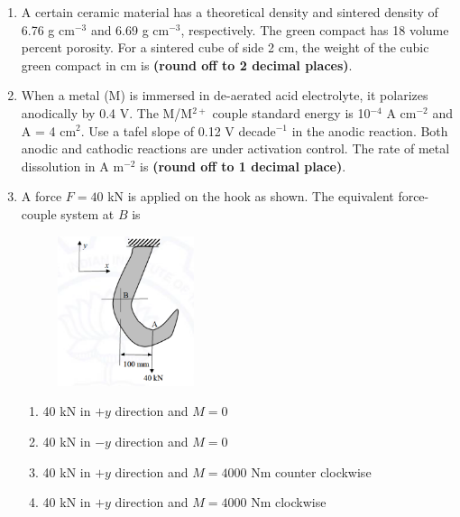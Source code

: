 \documentclass[journal]{IEEEtran}
\numberwithin{equation}{enumi}
\numberwithin{figure}{enumi}
\begin{document}
\begin{enumerate}[start=53]
    \item A certain ceramic material has a theoretical density and sintered density of 6.76 g cm$^{-3}$ and 6.69 g cm$^{-3}$, respectively. The green compact has 18 volume percent porosity. For a sintered cube of side 2 cm, the weight of the cubic green compact in cm is \textbf{(round off to 2 decimal places)}.

    \item When a metal (M) is immersed in de-aerated acid electrolyte, it polarizes anodically by 0.4 V. The M/M$^{2+}$ couple standard energy is 10$^{-4}$ A cm$^{-2}$ and A = 4 cm$^2$. Use a tafel slope of 0.12 V decade$^{-1}$ in the anodic reaction. Both anodic and cathodic reactions are under activation control. The rate of metal dissolution in A m$^{-2}$ is \textbf{(round off to 1 decimal place)}.

    \item A force $F = 40$ kN is applied on the hook as shown. The equivalent force-couple system at $B$ is
     \begin{figure}[!ht]
    \centering
    \includegraphics[width=4cm]{figs/fig1.png}
    \end{figure}
    \begin{enumerate}
        \item 40 kN in $+y$ direction and $M = 0$
        \item 40 kN in $-y$ direction and $M = 0$
        \item 40 kN in $+y$ direction and $M = 4000$ Nm counter clockwise
        \item 40 kN in $+y$ direction and $M = 4000$ Nm clockwise
    \end{enumerate}
\end{enumerate}
\end{document}
